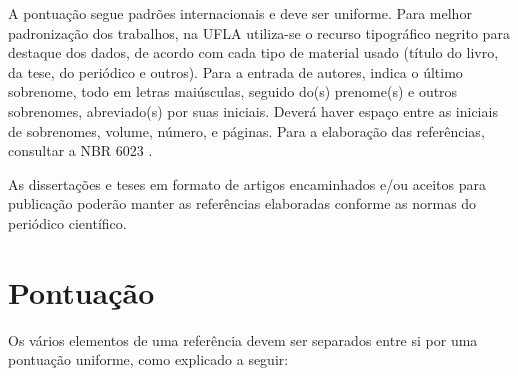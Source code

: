 A pontuação segue padrões internacionais e deve ser uniforme. Para melhor padronização dos trabalhos, na UFLA utiliza-se o recurso tipográfico negrito para destaque dos dados, de acordo com cada tipo de material usado (título do livro, da tese, do periódico e outros). Para a entrada de autores, indica o último sobrenome, todo em letras maiúsculas, seguido do(s) prenome(s) e outros sobrenomes, abreviado(s) por suas iniciais. Deverá haver espaço entre as iniciais de sobrenomes, volume, número, e páginas. Para a elaboração das referências, consultar a NBR 6023 \cite{NBR6023:2002}.

As dissertações e teses em formato de artigos encaminhados e/ou aceitos para publicação poderão manter as referências elaboradas conforme as normas do periódico científico. 


\section{Pontuação}

Os vários elementos de uma referência devem ser separados entre si por uma pontuação uniforme, como explicado a seguir:

